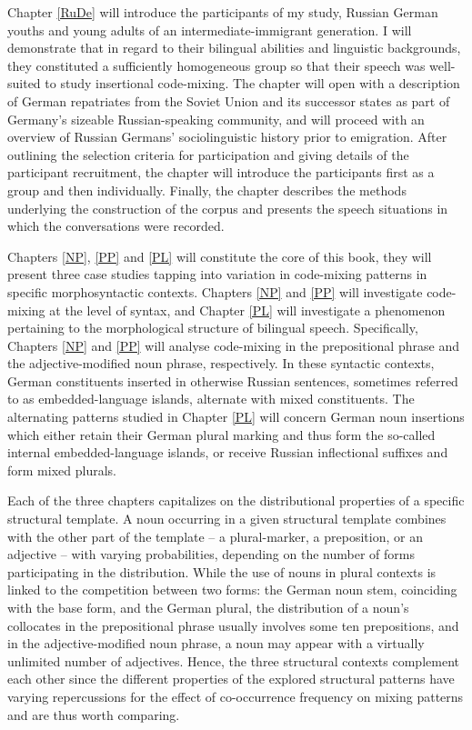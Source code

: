 Chapter \ref{RuDe} will introduce the participants of my study, Russian German youths and young adults of an intermediate-immigrant generation. I will demonstrate that in regard to their bilingual abilities and linguistic backgrounds, they constituted a sufficiently homogeneous group so that their speech was well-suited to study insertional code-mixing. The chapter will open with a description of German repatriates from the Soviet Union and its successor states as part of Germany's sizeable Russian-speaking community, and will proceed with an overview of Russian Germans' sociolinguistic history prior to emigration. After outlining the selection criteria for participation and giving details of the participant recruitment, the chapter will introduce the participants first as a group and then individually. Finally, the chapter describes the methods underlying the construction of the corpus and presents the speech situations in which the  conversations were recorded.

Chapters \ref{NP}, \ref{PP} and \ref{PL} will constitute the core of this book, they will present three case studies tapping into variation in code-mixing patterns in specific morphosyntactic contexts. Chapters \ref{NP} and \ref{PP} will investigate code-mixing at the level of syntax, and Chapter \ref{PL} will investigate a phenomenon pertaining to the morphological structure of bilingual speech. Specifically, Chapters \ref{NP} and \ref{PP} will analyse code-mixing in the prepositional phrase and the adjective-modified noun phrase, respectively. In these syntactic contexts, German constituents inserted in otherwise Russian sentences, sometimes referred to as  embedded-language islands, alternate with mixed constituents. The alternating patterns studied in Chapter \ref{PL} will concern German noun insertions which either retain their German plural marking and thus form the so-called internal embedded-language islands, or receive Russian inflectional suffixes and form mixed plurals. 

Each of the three chapters capitalizes on the  distributional properties of a specific structural template. A noun occurring in a given structural template combines with the other part of the template -- a plural-marker, a preposition, or an  adjective -- with varying probabilities, depending on the number of forms participating in the distribution. While the use of nouns in plural contexts is linked to the competition between two forms: the German noun stem,  coinciding with the base form, and the German plural, the distribution of a noun's collocates in the prepositional phrase usually involves some ten prepositions, and in the adjective-modified noun phrase, a noun may appear with a virtually unlimited number of adjectives. Hence,  the three structural contexts complement each other since the different properties of the explored structural patterns have varying repercussions for the effect of co-occurrence frequency on mixing patterns and are thus worth comparing.


